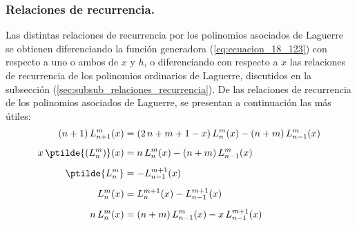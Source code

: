\subsubsection{Relaciones de recurrencia.}

Las distintas relaciones de recurrencia por los polinomios asociados de Laguerre se obtienen diferenciando la función generadora (\ref{eq:ecuacion_18_123}) con respecto a uno o ambos de $x$ y $h$, o diferenciando con respecto a $x$ las relaciones de recurrencia de los polinomios ordinarios de Laguerre, discutidos en la subsección (\ref{sec:subsub_relaciones_recurrencia}). De las relaciones de recurrencia de los polinomios asociados de Laguerre, se presentan a continuación las más útiles:
\begin{align}
(n + 1) \, L_{n+1}^{m} (x) &= (2 \, n + m + 1 - x) \, L_{n}^{m} (x) - (n + m) \, L_{n-1}^{m} (x) \label{eq:ecuacion_18_124} \\[0.5em]
x \, \ptilde{(L_{n}^{m})} (x) &= n \, L_{n}^{m} (x) - (n + m) \, L_{n-1}^{m} (x) \label{eq:ecuacion_18_125} \\[0.5em]
\ptilde{L_{n}^{m}} &= - L_{n-1}^{m+1} (x) \label{eq:ecuacion_18_125a} \\[0.5em]
L_{n}^{m} (x) &= L_{n}^{m+1} (x) - L_{n-1}^{m+1} (x) \label{eq:ecuacion_18_125b} \\[0.5em]
n \, L_{n}^{m} (x) &= (n + m) \, L_{n-1}^{m} (x) - x \, L_{n-1}^{m+1} (x) \label{eq:ecuacion_18_125c}
\end{align}
